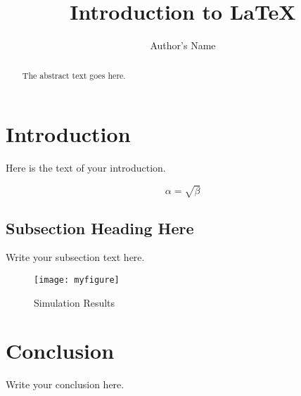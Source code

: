 \documentclass{article}
\begin{document}
\title{Introduction to \LaTeX{}}
\author{Author's Name}

\maketitle

\begin{abstract}
The abstract text goes here.
\end{abstract}

\section{Introduction}
Here is the text of your introduction.

\begin{equation}
    \label{simple_equation}
    \alpha = \sqrt{ \beta }
\end{equation}

\subsection{Subsection Heading Here}
Write your subsection text here.

\begin{figure}
    \centering
    \texttt{[image: myfigure]}
    \caption{Simulation Results}
    \label{simulationfigure}
\end{figure}

\section{Conclusion}
Write your conclusion here.
\end{document}
